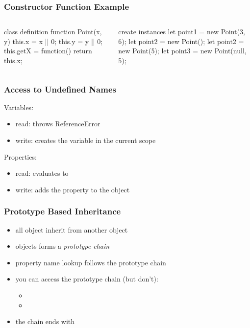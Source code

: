 \begin{frame}[fragile] \frametitle{Constructor Function Example}

\begin{columns}[onlytextwidth]
  \begin{column}{0.5\textwidth}
\begin{CodeBox}{class definition}
function Point(x, y) {
  this.x = x || 0;
  this.y = y || 0;
  this.getX = function() {
    return this.x;
  }
}
\end{CodeBox}
  \end{column}
  \begin{column}{0.5\textwidth}
\begin{CodeBox}{create instances}
let point1 = new Point(3, 6);
let point2 = new Point();
let point2 = new Point(5);
let point3 = 
  new Point(null, 5);
\end{CodeBox}
  \end{column}
\end{columns}%
\end{frame}

\begin{frame}[fragile] \frametitle{Access to Undefined Names}
Variables:
\begin{itemize}
  \item read: throws ReferenceError
  \item write: creates the variable in the current scope
\end{itemize}
\vspace{5mm}
Properties:
\begin{itemize}
  \item read: evaluates to 
  \item write: adds the property to the object
\end{itemize}
\end{frame}

\begin{frame}[fragile] \frametitle{Prototype Based Inheritance}

\begin{itemize}
  \item all object inherit from another object
  \item objects forms a \emph{prototype chain}
  \item property name lookup follows the prototype chain
  \item you can access the prototype chain (but don't):
  \begin{itemize}
    \item {}
    \item {}
  \end{itemize}
  \item the chain ends with 
\end{itemize}
\end{frame}

